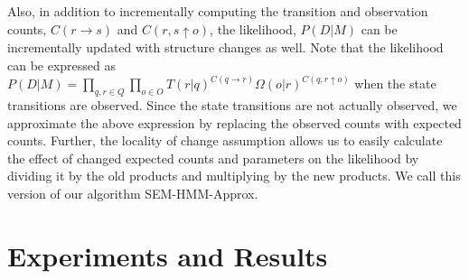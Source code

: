 \documentclass[letterpaper]{article}
\begin{document}


Also, in addition to incrementally computing the transition and observation counts, $C(r \rightarrow s)$ and $C(r,s \uparrow o)$, the likelihood, $P(D|M)$ can be incrementally updated with structure changes as well. Note that the likelihood can be expressed as $P(D|M) = \prod_{q, r \in Q} \prod_{o \in O} T(r|q)^{C(q \rightarrow r)} \Omega(o|r)^{C(q,r \uparrow o)}$ when the state transitions are observed. Since the state transitions are not actually observed, we approximate the above expression by replacing the observed counts with expected counts. Further, the locality of change assumption allows us to easily 
calculate the effect of changed expected counts and parameters on the likelihood by dividing it by the old products and multiplying by the new products. We call this version of our algorithm SEM-HMM-Approx.

\section{Experiments and Results}
\vspace{-.05in}
\end{document}
